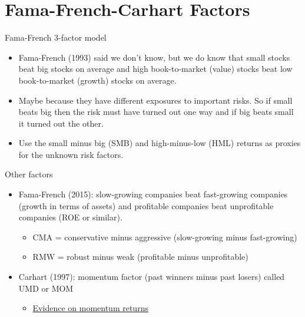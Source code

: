 \documentclass[10pt]{beamer}
\begin{document}
\section{Fama-French-Carhart Factors}

\begin{frame}{Fama-French 3-factor model}
\begin{itemize}
\item  Fama-French (1993) said we don't know, but we do know that small stocks beat big stocks on average and high book-to-market (value) stocks beat low book-to-market (growth) stocks on average.
\item Maybe because they have different exposures to important risks.  So if small beats big then the risk must have turned out one way and if big beats small it turned out the other.
\item \pause Use the small minus big (SMB) and high-minus-low (HML) returns as proxies for the unknown risk factors.

\end{itemize}
\end{frame}

\begin{frame}{Other factors}
    \begin{itemize}
    \item Fama-French (2015): slow-growing companies beat fast-growing companies (growth in terms of assets) and profitable companies beat unprofitable companies (ROE or similar).
    \begin{itemize}
    \item CMA = conservative minus aggressive (slow-growing minus fast-growing)
    \item RMW = robust minus weak (profitable minus unprofitable)
    \end{itemize}
   \item Carhart (1997): momentum factor (past winners minus past losers) called UMD or MOM
   \begin{itemize}
   \item \href{https://learn-investments.rice-business.org/factor-investing/quintiles}{Evidence on momentum returns}
   \end{itemize}
\end{itemize}
\end{frame}
\end{document}
